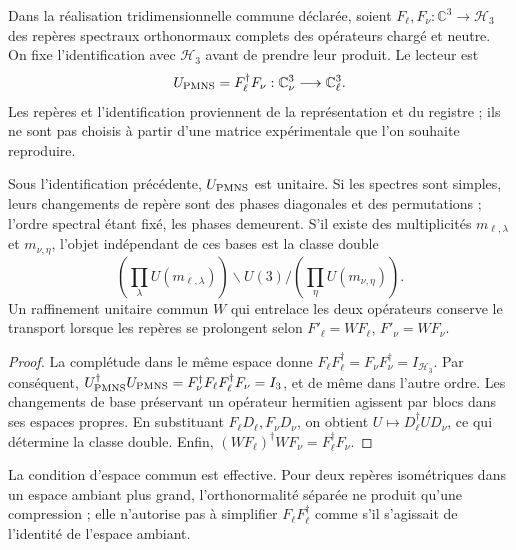\begin{definition}
Dans la réalisation tridimensionnelle commune déclarée, soient
\(F_\ell,F_\nu:\mathbb C^3\to\mathcal H_3\) des repères spectraux
orthonormaux complets des opérateurs chargé et neutre. On fixe
l'identification avec \(\mathcal H_3\) avant de prendre leur produit. Le lecteur est
\begin{equation}
 U_{\rm PMNS}=F_\ell^\dagger F_\nu:
 \mathbb C^3_\nu\longrightarrow\mathbb C^3_\ell.
 \label{ii:eq:ii-pmns-frames}
\end{equation}
Les repères et l'identification proviennent de la représentation et du
registre ; ils ne sont pas choisis à partir d'une matrice expérimentale que l'on souhaite
reproduire.
\end{definition}

\begin{theorem}
Sous l'identification précédente, \(U_{\rm PMNS}\) est unitaire.
Si les spectres sont simples, leurs changements de repère sont des phases diagonales
et des permutations ; l'ordre spectral étant fixé, les phases demeurent.
S'il existe des multiplicités \(m_{\ell,\lambda}\) et \(m_{\nu,\eta}\),
l'objet indépendant de ces bases est la classe double
\begin{equation}
 \left(\prod_\lambda U(m_{\ell,\lambda})\right)
 \backslash U(3) /
 \left(\prod_\eta U(m_{\nu,\eta})\right).
 \label{ii:eq:ii-pmns-double-class}
\end{equation}
Un raffinement unitaire commun \(W\) qui entrelace les deux opérateurs
conserve le transport lorsque les repères se prolongent selon
\(F'_\ell=WF_\ell\), \(F'_\nu=WF_\nu\).
\end{theorem}

\begin{proof}
La complétude dans le même espace donne
\(F_\ell F_\ell^\dagger=F_\nu F_\nu^\dagger=I_{\mathcal H_3}\).
Par conséquent,
\(U_{\rm PMNS}^\dagger U_{\rm PMNS}
=F_\nu^\dagger F_\ell F_\ell^\dagger F_\nu=I_3\), et de même
dans l'autre ordre. Les changements de base préservant un opérateur hermitien
agissent par blocs dans ses espaces propres. En substituant
\(F_\ell D_\ell,F_\nu D_\nu\), on obtient
\(U\mapsto D_\ell^\dagger UD_\nu\), ce qui détermine la classe double.
Enfin, \((WF_\ell)^\dagger WF_\nu=F_\ell^\dagger F_\nu\).
\end{proof}

La condition d'espace commun est effective. Pour deux repères isométriques dans
un espace ambiant plus grand, l'orthonormalité séparée ne produit qu'une
compression ; elle n'autorise pas à simplifier \(F_\ell F_\ell^\dagger\) comme
s'il s'agissait de l'identité de l'espace ambiant.

